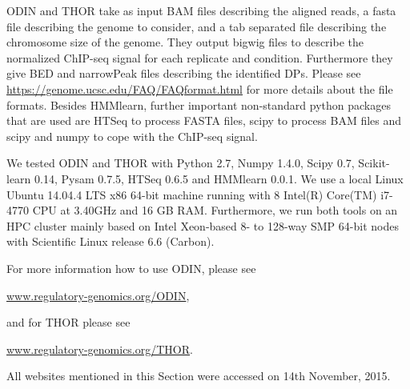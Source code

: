 ODIN and THOR take as input BAM files describing the aligned reads, a fasta file describing the genome to consider, and a tab separated file describing the chromosome size of the genome.
They output bigwig files to describe the normalized ChIP-seq signal for each replicate and condition.
Furthermore they give BED and narrowPeak files describing the identified DPs.
Please see \url{https://genome.ucsc.edu/FAQ/FAQformat.html} for more details about the file formats.
Besides HMMlearn, further important non-standard python packages that are used are HTSeq to process FASTA files, scipy to process BAM files and scipy and numpy to cope with the ChIP-seq signal.

We tested ODIN and THOR with Python 2.7, Numpy 1.4.0, Scipy 0.7, Scikit-learn 0.14, Pysam 0.7.5, HTSeq 0.6.5 and HMMlearn 0.0.1.
We use a local Linux Ubuntu 14.04.4 LTS x86 64-bit machine running with 8 Intel(R) Core(TM) i7-4770 CPU at 3.40GHz and 16 GB RAM.
Furthermore, we run both tools on an HPC cluster mainly based on Intel Xeon-based 8- to 128-way SMP 64-bit nodes with Scientific Linux release 6.6 (Carbon).

\noindent
For more information how to use ODIN, please see

\begin{center}
 \url{www.regulatory-genomics.org/ODIN},
\end{center}

\noindent
and for THOR please see 

\begin{center}
 \url{www.regulatory-genomics.org/THOR}.
\end{center}


\noindent
All websites mentioned in this Section were accessed on 14th November, 2015.


